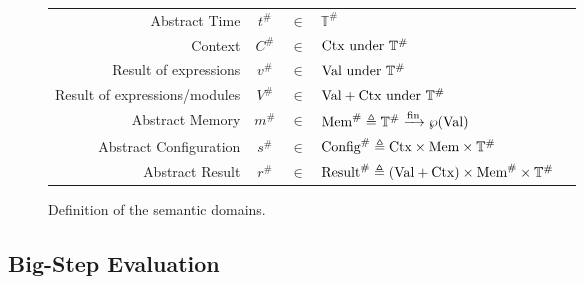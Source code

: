 \documentclass[acmsmall,screen,review]{acmart}
\theoremstyle{definition}
\newcommand*{\A}[1]{{#1}^{\#}}
\newcommand*{\Time}{\mathbb{T}}
\newcommand*{\ATime}{\A{\Time}}
\newcommand*{\Ctx}[1]{\text{Ctx}\vphantom{#1}}
\newcommand*{\Value}[1]{\text{Val}\vphantom{#1}}
\newcommand*{\Mem}[1]{\text{Mem}\vphantom{#1}}
\newcommand*{\mem}{m}
\newcommand*{\AMem}[1]{\A{\text{Mem}}\vphantom{#1}}
\newcommand*{\AConfig}[1]{\A{\text{Config}}\vphantom{#1}}
\newcommand*{\AResult}[1]{\A{\text{Result}}\vphantom{#1}}
\newcommand*{\fin}[2]{{#1}\xrightarrow{\text{fin}}{#2}}
\begin{document}
\begin{figure}[htb]
  \centering
  \footnotesize
  \begin{tabular}{rccll}
    Abstract Time                 & $\A{t}$  & $\in$ & $\ATime$                                                                                   \\
    Context                       & $\A{C}$  & $\in$ & $\Ctx\ATime\text{ under }\ATime$                                                           \\
    Result of expressions         & $\A{v}$  & $\in$ & $\Value\ATime\text{ under }\ATime$                                                         \\
    Result of expressions/modules & $\A{V}$  & $\in$ & $\Value{\ATime}+\Ctx{\ATime}\text{ under }\ATime$                                          \\
    Abstract Memory               & $\A\mem$ & $\in$ & $\AMem{\ATime} \triangleq \fin{\ATime}{\wp(\Value{\ATime})}$                               \\
    Abstract Configuration        & $\A{s}$  & $\in$ & $\AConfig{\ATime} \triangleq \Ctx{\ATime}\times\Mem{\ATime}\times\ATime$                   \\
    Abstract Result               & $\A{r}$  & $\in$ & $\AResult{\ATime} \triangleq (\Value{\ATime}+\Ctx{\ATime})\times\AMem{\ATime}\times\ATime$ \\
  \end{tabular}
  \caption{Definition of the semantic domains.}
\end{figure}

\subsection{Big-Step Evaluation}
\end{document}
